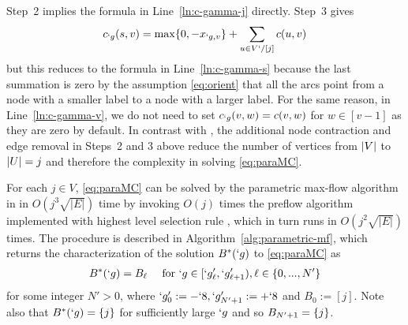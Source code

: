 \documentclass[conference,letterpaper]{IEEEtran}
\begin{document}
%
Step~2 implies the formula in Line~\ref{ln:c-gamma-j} directly.
Step~3 gives
\begin{align*}
c_{`g}(s,v)=\max\{0,-x_{`g,v}\}+\sum_{u\in V`/[j]} c(u,v)
\end{align*}
but this reduces to the formula in Line~\ref{ln:c-gamma-s} because the last summation is zero by the
assumption \eqref{eq:orient} that all the arcs point from a node with a smaller label to a node with
a larger label.
For the same reason, in Line~\ref{ln:c-gamma-v}, we do not need to set
$c_{`g}(v,w)=c(v,w)$ for $w\in [v-1]$ as they are zero by default. 
%
In contrast with \cite{kolmogorov10}, the additional node contraction and edge removal in Steps~2 and 3 above reduce the number of
vertices from $\lvert V\rvert$ to $\lvert U\rvert=j$
and therefore the complexity in solving \eqref{eq:paraMC}.


For each $j\in V$, \eqref{eq:paraMC} can be solved by the parametric max-flow algorithm in \cite{gallo89} in $O(j^3\sqrt{|E|})$ time by invoking $O(j)$ times the preflow algorithm \cite{goldberg87-thesis,goldberg88-maxflow} implemented with highest
level selection rule \cite{cherkassky97-push-relable}, which in turn
runs in $O(j^2\sqrt{|E|})$ times. The procedure is described in Algorithm~\ref{alg:parametric-mf}, which returns the characterization of the solution $B^*(`g)$ to \eqref{eq:paraMC} as 
\begin{align}
B^*(`g) = B_{\ell} \kern1em \text{ for } `g\in [`g'_{\ell},`g'_{\ell+1}), \ell \in \{0,...,N'\}
\label{eq:B^*}
\end{align}
for some integer $N'>0$, where $`g'_{0}:=-`8, `g'_{N'+1}:=+`8$ and $B_{0}:=[j]$. Note also that $B^*(`g)=\{j\}$ for sufficiently
large ${`g}$ and so $B_{N'+1}=\{j\}$.
\end{document}
